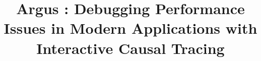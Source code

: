 \documentclass[pageno]{jpaper}
\newcommand{\mytitle}[0]{\textbf {Argus : Debugging Performance Issues in Modern Applications with Interactive Causal Tracing}}
\begin{document}
\title{\mytitle}

\date{}
\maketitle

\thispagestyle{empty}
\begin{abstract}

\end{abstract}












\end{document}
